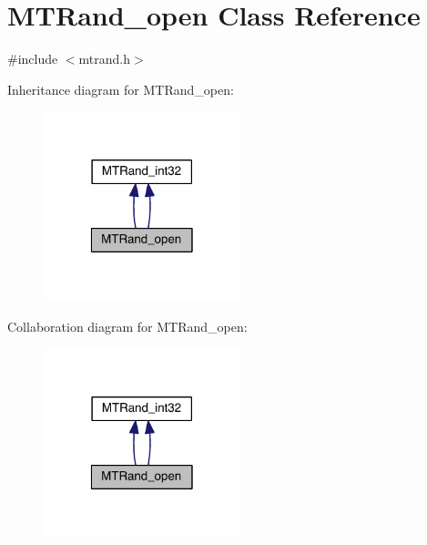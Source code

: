 \hypertarget{a00019}{\section{M\+T\+Rand\+\_\+open Class Reference}
\label{a00019}
}


{\ttfamily \#include $<$mtrand.\+h$>$}



Inheritance diagram for M\+T\+Rand\+\_\+open\+:\nopagebreak
\begin{figure}[H]
\begin{center}
\leavevmode
\includegraphics[width=162pt]{a00226}
\end{center}
\end{figure}


Collaboration diagram for M\+T\+Rand\+\_\+open\+:\nopagebreak
\begin{figure}[H]
\begin{center}
\leavevmode
\includegraphics[width=162pt]{a00227}
\end{center}
\end{figure}
